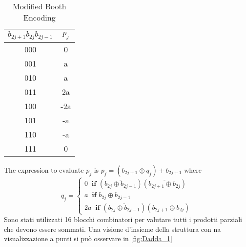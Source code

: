 \begin{table}[htb]
	\centering
	\begin{tabular}{cc}
		$b_{2j+1}b_{2j}b_{2j-1}$ & $p_j$ \\ 
		\hline 
		000 & 0 \\ 
		001 & a \\ 
		010 & a \\ 
		011 & 2a \\ 
		100 & -2a \\ 
		101 & -a \\ 
		110 & -a \\ 
		111 & 0 \\ 
	\end{tabular}  
	\label{tab:MBE}
	\caption{Modified Booth Encoding}
\end{table}
The expression to evaluate $p_j$ is $p_j = (b_{2j+1} \oplus q_j) + b_{2j+1}$ where
$$ q_j=
\begin{cases}
0 \ \textbf{  if   } (\overline{b_{2j} \oplus b_{2j-1}})(\overline{b_{2j+1} \oplus b_{2j}})\\
a \ \textbf{  if   } b_{2j} \oplus b_{2j-1}\\
2a \ \textbf{  if   } (\overline{b_{2j} \oplus b_{2j-1}})(b_{2j+1} \oplus b_{2j})
\end{cases}
$$
Sono stati utilizzati 16 blocchi combinatori per valutare tutti i prodotti parziali che devono essere sommati. Una visione d'insieme della struttura con na visualizzazione a punti si può osservare in \autoref{fig:Dadda_1}

